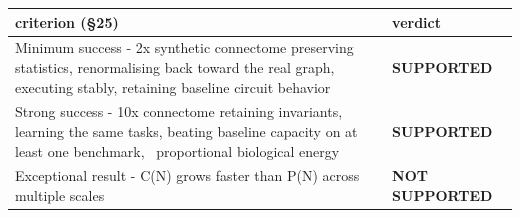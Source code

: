 {\small\setlength{\tabcolsep}{3pt}
\begin{tabular}{p{10.6cm} l}
\toprule
criterion (\S 25) & verdict \\
\midrule
Minimum success - 2x synthetic connectome preserving statistics, renormalising back toward the real graph, executing stably, retaining baseline circuit behavior & \textbf{SUPPORTED} \\
Strong success - 10x connectome retaining invariants, learning the same tasks, beating baseline capacity on at least one benchmark, ~proportional biological energy & \textbf{SUPPORTED} \\
Exceptional result - C(N) grows faster than P(N) across multiple scales & \textbf{NOT SUPPORTED} \\
\bottomrule
\end{tabular}

}
